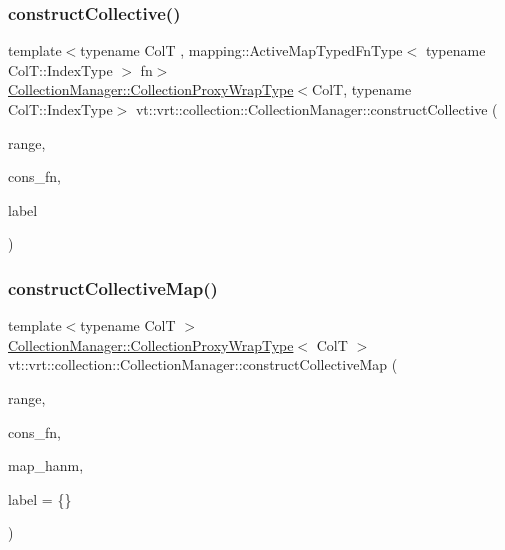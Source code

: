 \subsubsection{\texorpdfstring{construct\+Collective()}{constructCollective()}\hspace{0.1cm}{\footnotesize\ttfamily [6/6]}}
{\footnotesize\ttfamily template$<$typename ColT , mapping\+::\+Active\+Map\+Typed\+Fn\+Type$<$ typename Col\+T\+::\+Index\+Type $>$ fn$>$ \\
\hyperlink{structvt_1_1vrt_1_1collection_1_1_collection_manager_a56458ed7f9bb22b631b9b3a745f42f94}{Collection\+Manager\+::\+Collection\+Proxy\+Wrap\+Type}$<$ColT, typename Col\+T\+::\+Index\+Type$>$ vt\+::vrt\+::collection\+::\+Collection\+Manager\+::construct\+Collective (\begin{DoxyParamCaption}\item[{typename Col\+T\+::\+Index\+Type}]{range,  }\item[{\hyperlink{structvt_1_1vrt_1_1collection_1_1_collection_manager_a9ef5ab71e344fdee8525c3f18241c305}{Distrib\+Construct\+Fn}$<$ ColT $>$}]{cons\+\_\+fn,  }\item[{std\+::string const \&}]{label }\end{DoxyParamCaption})}

\mbox{\label{structvt_1_1vrt_1_1collection_1_1_collection_manager_a9b78bd325f19c36907e681e83bbd9398}} 
\subsubsection{\texorpdfstring{construct\+Collective\+Map()}{constructCollectiveMap()}}
{\footnotesize\ttfamily template$<$typename ColT $>$ \\
\hyperlink{structvt_1_1vrt_1_1collection_1_1_collection_manager_a56458ed7f9bb22b631b9b3a745f42f94}{Collection\+Manager\+::\+Collection\+Proxy\+Wrap\+Type}$<$ ColT $>$ vt\+::vrt\+::collection\+::\+Collection\+Manager\+::construct\+Collective\+Map (\begin{DoxyParamCaption}\item[{typename Col\+T\+::\+Index\+Type}]{range,  }\item[{\hyperlink{structvt_1_1vrt_1_1collection_1_1_collection_manager_a9ef5ab71e344fdee8525c3f18241c305}{Distrib\+Construct\+Fn}$<$ ColT $>$}]{cons\+\_\+fn,  }\item[{\hyperlink{namespacevt_af64846b57dfcaf104da3ef6967917573}{Handler\+Type} const}]{map\+\_\+hanm,  }\item[{std\+::string const \&}]{label = {\ttfamily \{\}} }\end{DoxyParamCaption})}



